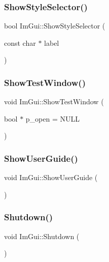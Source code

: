 \subsubsection{\texorpdfstring{Show\+Style\+Selector()}{ShowStyleSelector()}}
{\footnotesize\ttfamily bool Im\+Gui\+::\+Show\+Style\+Selector (\begin{DoxyParamCaption}\item[{const char $\ast$}]{label }\end{DoxyParamCaption})}

\hypertarget{namespace_im_gui_a52880ae1ecdd704a083558d31c9bfa50}{}\label{namespace_im_gui_a52880ae1ecdd704a083558d31c9bfa50} 
\subsubsection{\texorpdfstring{Show\+Test\+Window()}{ShowTestWindow()}}
{\footnotesize\ttfamily void Im\+Gui\+::\+Show\+Test\+Window (\begin{DoxyParamCaption}\item[{bool $\ast$}]{p\+\_\+open = {\ttfamily NULL} }\end{DoxyParamCaption})}

\hypertarget{namespace_im_gui_ad6f4919bc9aa806ca8d2c1d6e2bfb051}{}\label{namespace_im_gui_ad6f4919bc9aa806ca8d2c1d6e2bfb051} 
\subsubsection{\texorpdfstring{Show\+User\+Guide()}{ShowUserGuide()}}
{\footnotesize\ttfamily void Im\+Gui\+::\+Show\+User\+Guide (\begin{DoxyParamCaption}{ }\end{DoxyParamCaption})}

\hypertarget{namespace_im_gui_aeba34069558d4fbcf734a9c92ce3b773}{}\label{namespace_im_gui_aeba34069558d4fbcf734a9c92ce3b773} 
\subsubsection{\texorpdfstring{Shutdown()}{Shutdown()}}
{\footnotesize\ttfamily void Im\+Gui\+::\+Shutdown (\begin{DoxyParamCaption}{ }\end{DoxyParamCaption})}

